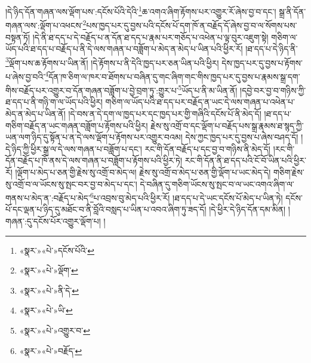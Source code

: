 །དེ་ཉིད་དོན་གཞན་ལས་ལྡོག་པས་:དངོས་པོའི་དེའི་\footnote{«སྣར་»«པེ་»དངོས་པོའི་}ཆ་འགའ་ཞིག་རྟོགས་པར་འགྱུར་རོ་ཞེས་བྱ་བ་དང་། སྒྲ་ནི་དོན་གཞན་ལས་:ལྡོག་པ་འཕངས་\footnote{«སྣར་»«པེ་»ལྡོག་}པས་ཁྱད་པར་དུ་བྱས་པའི་དངོས་པོ་དག་ཁོ་ན་བརྗོད་དོ་ཞེས་བྱ་བ་ལ་སོགས་པས་བསྟན་ཏོ། །དེ་ནི་ཐ་དད་པ་དེ་བརྗོད་པ་ན་དོན་ཐ་དད་པ་རྣམ་པར་གཅོད་པ་འཕེན་པ་ལྟ་བུར་འཇུག་སྟེ། གཅིག་ལ་ཡོད་པའི་ཐ་དད་པ་བརྗོད་པ་ནི་དེ་ལས་གཞན་པ་བཟློག་པ་མེད་ན་མེད་པ་ཡིན་པའི་ཕྱིར་རོ། །ཐ་དད་པ་དེ་ཉིད་ནི་\footnote{«སྣར་»«པེ་»ནི་དེ་}ལྡོག་པས་ཆ་རྟོགས་པ་ཡིན་ནོ། །དེ་རྟོགས་པ་ནི་དེའི་ཁྱད་པར་ཅན་ཡིན་པའི་ཕྱིར། དེས་ཁྱད་པར་དུ་བྱས་པ་རྟོགས་པ་ཞེས་བྱ་བའི་\footnote{«སྣར་»«པེ་»ཡི་}དོན་ཁ་ཅིག་ལ་ཁར་བ་ཐོགས་པ་བཞིན་དུ་གང་ཞིག་གང་གིས་ཁྱད་པར་དུ་བྱས་པ་རྣམས་སྒྲ་དག་གིས་བརྗོད་པར་འགྱུར་བ་དོན་གཞན་བཟློག་པ་བྱེ་བྲག་ཏུ་:གྱུར་པ་\footnote{«སྣར་»«པེ་»འགྱུར་བ་}ཡོད་པ་ནི་མ་ཡིན་ནོ། །དབྱེ་བར་བྱ་བ་གཉིས་ཀྱི་ཐ་དད་པ་ནི་གཉི་ག་ལ་ཡོད་པའི་ཕྱིར། གཅིག་ལ་ཡོད་པའི་ཐ་དད་པར་བརྗོད་ན་ཡང་དེ་ལས་གཞན་པ་འཕེན་པ་མེད་ན་མེད་པ་ཡིན་ནོ། །དེ་བས་ན་དེ་དག་ལ་ཁྱད་པར་དང་ཁྱད་པར་གྱི་གཞིའི་དངོས་པོ་ནི་མེད་དོ། །ཐ་དད་པ་གཅིག་བརྗོད་ན་ཡང་གཞན་བཟློག་པ་རྟོགས་པའི་ཕྱིར། རྗེས་སུ་འགྲོ་བ་དང་ལྡོག་པ་བརྗོད་པས་སྒྲ་རྣམས་ཐ་སྙད་ཀྱི་ཡན་ལག་ཉིད་དུ་སྟོན་པ་ན་དེ་ལས་ལྡོག་པ་རྟོགས་པར་འགྱུར་བའམ། དེས་ཀྱང་ཁྱད་པར་དུ་བྱས་པ་ཞེས་བཤད་དོ། །དེ་ཉིད་ཀྱི་ཕྱིར་སྒྲ་ལ་དེ་ལས་གཞན་པ་བཟློག་པ་དང་། རང་གི་དོན་བརྗོད་པ་དང་བྱ་བ་གཉིས་ནི་མེད་དོ། །རང་གི་དོན་བརྗོད་པ་ཁོ་ནས་དེ་ལས་གཞན་པ་བཟློག་པ་རྟོགས་པའི་ཕྱིར་ཏེ། རང་གི་དོན་ནི་ཐ་དད་པའི་ངོ་བོ་ཡིན་པའི་ཕྱིར་རོ། །ལྡོག་པ་མེད་པ་ཅན་གྱི་རྗེས་སུ་འགྲོ་བ་མེད་ལ། རྗེས་སུ་འགྲོ་བ་མེད་པ་ཅན་གྱི་ལྡོག་པ་ཡང་མེད་དེ། གཅིག་རྗེས་སུ་འགྲོ་བ་ལ་ཡོངས་སུ་སྤང་བར་བྱ་བ་མེད་པ་དང་། དེ་བཞིན་དུ་གཅིག་ཡོངས་སུ་སྤང་བ་ལ་ཡང་འགའ་ཞིག་ལ་གནས་པ་མེད་ན་:བརྗོད་པ་མེད་\footnote{«སྣར་»«པེ་»བརྗོད་}པ་འབྲས་བུ་མེད་པའི་ཕྱིར་རོ། །ཐ་དད་པ་དེ་ཡང་དངོས་པོ་མེད་པ་ཡིན་ཏེ། དངོས་པོ་དང་ལྡན་པ་ཉིད་དུ་མཐོང་བ་ནི་བློའི་བསླད་པ་ཡིན་པ་འབའ་ཞིག་ཏུ་ཟད་དོ། །དེ་ཕྱིར་དེ་ཉིད་དོན་དམ་མིན། །གཞན་:དུ་དངོས་པོར་འགྱུར་ལྡོག་པ། །
